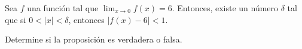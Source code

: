 \item Sea $f$ una función tal que $\lim_{x \to 0} f(x) = 6$. Entonces, existe un número $\delta$ tal que si $0 < |x| < \delta$, entonces $|f(x) - 6| < 1$.
\par
Determine si la proposición es verdadera o falsa.
